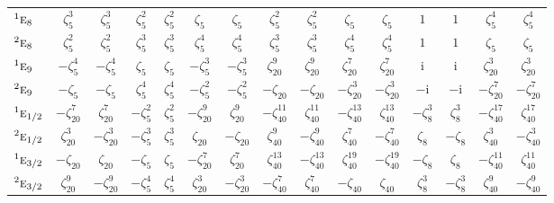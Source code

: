 \documentclass[10pt,a4paper]{article}
\makeatletter
\def\grouprule#1#2{\noalign{\marks\LTgroupmarks{\the\belowrulesep}\nobreak\vskip#1%
  \vskip\aboverulesep}\multispan\LT@cols\unskip{\leaders\hrule\@height#2\hfill\kern\z@}\cr
  \noalign{\penalty\LTrulebreak\vskip\belowrulesep\global\@lastruleclass\z@}}
\numberwithin{equation}{section}
\newcommand{\irr}[1]{\text{\normalfont\scshape #1}}
\newcommand{\conjpair}[1]{{}^{#1}}
\newcommand{\iunit}{\mathrm{i}}
\newcommand{\rootunity}[1]{\zeta_{#1}}
\makeatother
\begin{document}
{\begin{longtable}{@{}lcccccccccccccc@{}}
$\conjpair{1}\irr{e}_{8}$ & $\rootunity{5}^{3}$ & $\rootunity{5}^{3}$ & $\rootunity{5}^{2}$ & $\rootunity{5}^{2}$ & $\rootunity{5}$ & $\rootunity{5}$ & $\rootunity{5}^{2}$ & $\rootunity{5}^{2}$ & $\rootunity{5}$ & $\rootunity{5}$ & $1$ & $1$ & $\rootunity{5}^{4}$ & $\rootunity{5}^{4}$\\
$\conjpair{2}\irr{e}_{8}$ & $\rootunity{5}^{2}$ & $\rootunity{5}^{2}$ & $\rootunity{5}^{3}$ & $\rootunity{5}^{3}$ & $\rootunity{5}^{4}$ & $\rootunity{5}^{4}$ & $\rootunity{5}^{3}$ & $\rootunity{5}^{3}$ & $\rootunity{5}^{4}$ & $\rootunity{5}^{4}$ & $1$ & $1$ & $\rootunity{5}$ & $\rootunity{5}$\\
$\conjpair{1}\irr{e}_{9}$ & $-\rootunity{5}^{4}$ & $-\rootunity{5}^{4}$ & $\rootunity{5}$ & $\rootunity{5}$ & $-\rootunity{5}^{3}$ & $-\rootunity{5}^{3}$ & $\rootunity{20}^{9}$ & $\rootunity{20}^{9}$ & $\rootunity{20}^{7}$ & $\rootunity{20}^{7}$ & $\iunit{}$ & $\iunit{}$ & $\rootunity{20}^{3}$ & $\rootunity{20}^{3}$\\
$\conjpair{2}\irr{e}_{9}$ & $-\rootunity{5}$ & $-\rootunity{5}$ & $\rootunity{5}^{4}$ & $\rootunity{5}^{4}$ & $-\rootunity{5}^{2}$ & $-\rootunity{5}^{2}$ & $-\rootunity{20}$ & $-\rootunity{20}$ & $-\rootunity{20}^{3}$ & $-\rootunity{20}^{3}$ & $-\iunit{}$ & $-\iunit{}$ & $-\rootunity{20}^{7}$ & $-\rootunity{20}^{7}$\\
\grouprule{0pt}{\lightrulewidth}
$\conjpair{1}\irr{e}_{1/2}$ & $-\rootunity{20}^{7}$ & $\rootunity{20}^{7}$ & $-\rootunity{5}^{2}$ & $\rootunity{5}^{2}$ & $-\rootunity{20}^{9}$ & $\rootunity{20}^{9}$ & $-\rootunity{40}^{11}$ & $\rootunity{40}^{11}$ & $-\rootunity{40}^{13}$ & $\rootunity{40}^{13}$ & $-\rootunity{8}^{3}$ & $\rootunity{8}^{3}$ & $-\rootunity{40}^{17}$ & $\rootunity{40}^{17}$\\
$\conjpair{2}\irr{e}_{1/2}$ & $\rootunity{20}^{3}$ & $-\rootunity{20}^{3}$ & $-\rootunity{5}^{3}$ & $\rootunity{5}^{3}$ & $\rootunity{20}$ & $-\rootunity{20}$ & $\rootunity{40}^{9}$ & $-\rootunity{40}^{9}$ & $\rootunity{40}^{7}$ & $-\rootunity{40}^{7}$ & $\rootunity{8}$ & $-\rootunity{8}$ & $\rootunity{40}^{3}$ & $-\rootunity{40}^{3}$\\
$\conjpair{1}\irr{e}_{3/2}$ & $-\rootunity{20}$ & $\rootunity{20}$ & $-\rootunity{5}$ & $\rootunity{5}$ & $-\rootunity{20}^{7}$ & $\rootunity{20}^{7}$ & $\rootunity{40}^{13}$ & $-\rootunity{40}^{13}$ & $\rootunity{40}^{19}$ & $-\rootunity{40}^{19}$ & $-\rootunity{8}$ & $\rootunity{8}$ & $-\rootunity{40}^{11}$ & $\rootunity{40}^{11}$\\
$\conjpair{2}\irr{e}_{3/2}$ & $\rootunity{20}^{9}$ & $-\rootunity{20}^{9}$ & $-\rootunity{5}^{4}$ & $\rootunity{5}^{4}$ & $\rootunity{20}^{3}$ & $-\rootunity{20}^{3}$ & $-\rootunity{40}^{7}$ & $\rootunity{40}^{7}$ & $-\rootunity{40}$ & $\rootunity{40}$ & $\rootunity{8}^{3}$ & $-\rootunity{8}^{3}$ & $\rootunity{40}^{9}$ & $-\rootunity{40}^{9}$\\

\end{longtable}}
\end{document}
